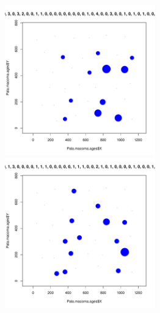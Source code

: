 \documentclass[12pt, a4paper]{disser}
\begin{document}
\begin{figure}[h]
	\begin{minipage}[b]{.46\linewidth}
	\begin{center}
		\includegraphics[width=65mm]{./Pala_macoma_age_bubb_N11_.pdf}
	\end{center}
	\end{minipage}
%
	\hfil %
%
	\begin{minipage}[b]{.46\linewidth}
	\begin{center}
		\includegraphics[width=65mm]{./Pala_macoma_age_bubb_N12_.pdf}
	\end{center}
	\end{minipage}





	\end{figure}
\end{document}
